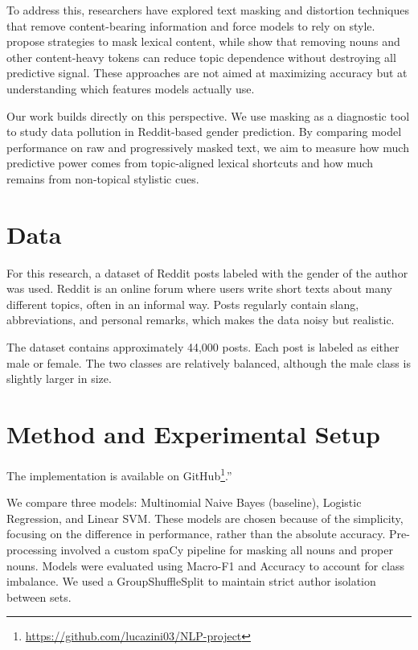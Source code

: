 \documentclass[11pt]{article}
\begin{document}
To address this, researchers have explored text masking and distortion techniques that remove content-bearing information and force models to rely on style. \citet{stamatatos2018masking} propose strategies to mask lexical content, while \citet{halvani2020posnoise} show that removing nouns and other content-heavy tokens can reduce topic dependence without destroying all predictive signal. These approaches are not aimed at maximizing accuracy but at understanding which features models actually use.

Our work builds directly on this perspective. We use masking as a diagnostic tool to study data pollution in Reddit-based gender prediction. By comparing model performance on raw and progressively masked text, we aim to measure how much predictive power comes from topic-aligned lexical shortcuts and how much remains from non-topical stylistic cues.

\section{Data}
For this research, a dataset of Reddit posts labeled with the gender of the author was used. Reddit
is an online forum where users write short texts about many different topics,
often in an informal way. Posts regularly contain slang, abbreviations, and
personal remarks, which makes the data noisy but realistic.

The dataset contains approximately 44,000 posts. Each post is labeled as either male or female. The two classes are relatively balanced, although the male class is slightly larger in size.


\section{Method and Experimental Setup}

The implementation is available on GitHub\footnote{\url{https://github.com/lucazini03/NLP-project}}.”

We compare three models: Multinomial Naive Bayes (baseline), Logistic Regression, and Linear SVM. These models are chosen because of the simplicity, focusing on the difference in performance, rather than the absolute accuracy. Pre-processing involved a custom spaCy pipeline for masking all nouns and proper nouns. Models were evaluated using Macro-F1 and Accuracy to account for class imbalance. We used a GroupShuffleSplit to maintain strict author isolation between sets.
\end{document}
